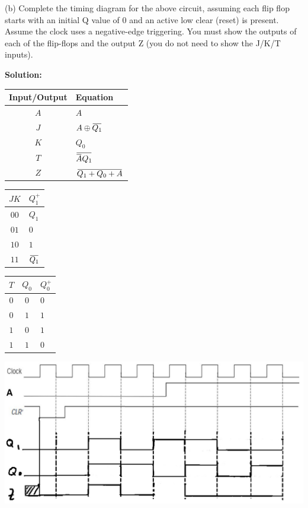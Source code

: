 \documentclass{article}
\newcommand{\overbar}[1]{\mkern 1.5mu\overline{\mkern-1.5mu#1\mkern-1.5mu}\mkern 1.5mu}
\begin{document}
    (b) Complete the timing diagram for the above circuit, assuming each flip flop 
    starts with an initial Q value of 0 and an active low clear (reset) is present. 
    Assume the clock uses a negative-edge triggering. You must show the outputs of each 
    of the flip-flops and the output Z (you do not need to show the J/K/T inputs).

    \textbf{Solution:}

    \begin{center}
        \begin{tabular} {c|l}
            Input/Output & Equation \\
            \hline
            $A$ & $A$ \\
            $J$ & $A\oplus \overbar{Q_1}$ \\
            $K$ & $Q_0$ \\
            $T$ & $\overbar{\overbar{A}Q_1}$ \\
            $Z$ & $\overbar{Q_1+Q_0+A}$ 
        \end{tabular}
        \quad
        \begin{tabular} {c|l}
            $JK$ & $Q_1^+$ \\
            \hline
            $00$ & $Q_1$ \\
            $01$ & $0$ \\
            $10$ & $1$ \\
            $11$ & $\overbar{Q_1}$
        \end{tabular}
        \quad
        \begin{tabular} {c|c|l}
            $T$ & $Q_0$ & $Q_0^+$ \\
            \hline
            $0$ & $0$ & $0$ \\
            $0$ & $1$ & $1$ \\
            $1$ & $0$ & $1$ \\
            $1$ & $1$ & $0$
        \end{tabular}
    \end{center}

    \begin{center}
        \includegraphics[width=\linewidth]{Q5_Question_b.jpg}
    \end{center}
\end{document}
